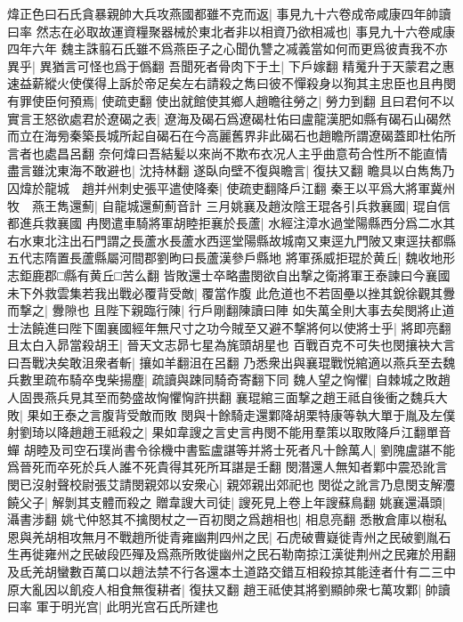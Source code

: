 煒正色曰石氏貪暴親帥大兵攻燕國都雖不克而返|{
	事見九十六卷成帝咸康四年帥讀曰率}
然志在必取故運資糧聚器械於東北者非以相資乃欲相㓕也|{
	事見九十六卷咸康四年六年}
魏主誅翦石氏雖不爲燕臣子之心聞仇讐之㓕義當如何而更爲彼責我不亦異乎|{
	異猶言可怪也爲于僞翻}
吾聞死者骨肉下于土|{
	下戶嫁翻}
精䰟升于天蒙君之惠速益薪縱火使僕得上訴於帝足矣左右請殺之雋曰彼不憚殺身以狥其主忠臣也且冉閔有罪使臣何預焉|{
	使疏吏翻}
使出就館使其鄉人趙瞻往勞之|{
	勞力到翻}
且曰君何不以實言王怒欲處君於遼碣之表|{
	遼海及碣石爲遼碣杜佑曰盧龍漢肥如縣有碣石山碣然而立在海㫄秦築長城所起自碣石在今高麗舊界非此碣石也趙瞻所謂遼碣蓋即杜佑所言者也處昌呂翻}
奈何煒曰吾結髪以來尚不欺布衣况人主乎曲意苟合性所不能直情盡言雖沈東海不敢避也|{
	沈持林翻}
遂臥向壁不復與瞻言|{
	復扶又翻}
瞻具以白雋雋乃囚煒於龍城　趙并州刺史張平遣使降秦|{
	使疏吏翻降戶江翻}
秦王以平爲大將軍冀州牧　燕王雋還薊|{
	自龍城還薊薊音計}
三月姚襄及趙汝陰王琨各引兵救襄國|{
	琨自信都進兵救襄國}
冉閔遣車騎將軍胡睦拒襄於長蘆|{
	水經注漳水過堂陽縣西分爲二水其右水東北注出石門謂之長蘆水長蘆水西逕堂陽縣故城南又東逕九門陂又東逕扶都縣五代志隋置長蘆縣屬河間郡劉昫曰長蘆漢參戶縣地}
將軍孫威拒琨於黄丘|{
	魏收地形志鉅鹿郡□縣有黄丘□苦么翻}
皆敗還士卒略盡閔欲自出撃之衛將軍王泰諫曰今襄國未下外救雲集若我出戰必覆背受敵|{
	覆當作腹}
此危道也不若固壘以挫其銳徐觀其釁而撃之|{
	釁隙也}
且陛下親臨行陳|{
	行戶剛翻陳讀曰陣}
如失萬全則大事去矣閔將止道士法饒進曰陛下圍襄國經年無尺寸之功今賊至又避不撃將何以使將士乎|{
	將即亮翻}
且太白入昴當殺胡王|{
	晉天文志昴七星為旄頭胡星也}
百戰百克不可失也閔攘袂大言曰吾戰决矣敢沮衆者斬|{
	攘如羊翻沮在呂翻}
乃悉衆出與襄琨戰悦綰適以燕兵至去魏兵數里疏布騎卒曳柴揚塵|{
	疏讀與踈同騎奇寄翻下同}
魏人望之恟懼|{
	自棘城之敗趙人固畏燕兵見其至而勢盛故恟懼恟許拱翻}
襄琨綰三面撃之趙王祗自後衝之魏兵大敗|{
	果如王泰之言腹背受敵而敗}
閔與十餘騎走還鄴降胡栗特康等執大單于胤及左僕射劉琦以降趙趙王祗殺之|{
	果如韋謏之言史言冉閔不能用羣策以取敗降戶江翻單音蟬}
胡睦及司空石璞尚書令徐機中書監盧諶等并將士死者凡十餘萬人|{
	劉隗盧諶不能爲晉死而卒死於兵人誰不死貴得其死所耳諶是壬翻}
閔潛還人無知者鄴中震恐訛言閔已沒射聲校尉張艾請閔親郊以安衆心|{
	親郊親出郊祀也}
閔從之訛言乃息閔支解灋饒父子|{
	解剝其支體而殺之}
贈韋謏大司徒|{
	謏死見上卷上年謏蘇鳥翻}
姚襄還灄頭|{
	灄書涉翻}
姚弋仲怒其不擒閔杖之一百初閔之爲趙相也|{
	相息亮翻}
悉散倉庫以樹私恩與羌胡相攻無月不戰趙所徙青雍幽荆四州之民|{
	石虎破曹嶷徙青州之民破劉胤石生再徙雍州之民破段匹殫及爲燕所敗徙幽州之民石勒南掠江漢徙荆州之民雍於用翻}
及氐羌胡蠻數百萬口以趙法禁不行各還本土道路交錯互相殺掠其能逹者什有二三中原大亂因以飢疫人相食無復耕者|{
	復扶又翻}
趙王祗使其將劉顯帥衆七萬攻鄴|{
	帥讀曰率}
軍于明光宫|{
	此明光宫石氏所建也}
